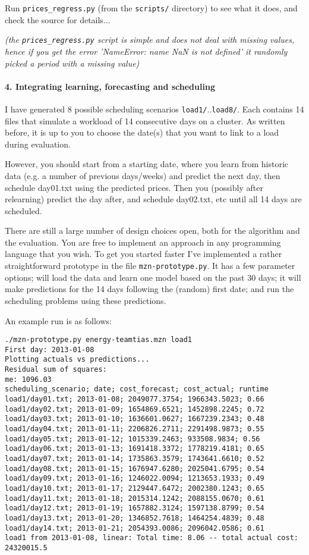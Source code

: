 \documentclass[a4,12pt]{article}
\begin{document}
Run \texttt{prices\_regress.py} (from the \texttt{scripts/} directory) to see what it does, and check the source for details...

\textit{(the \texttt{prices\_regress.py} script is simple and does not deal with missing values, hence if you get the error 'NameError: name NaN is not defined' it randomly picked a period with a missing value)}

\paragraph{4. Integrating learning, forecasting and scheduling}
I have generated 8 possible scheduling scenarios \texttt{load1/}..\texttt{load8/}. Each contains 14 files that simulate a workload of 14 consecutive days on a cluster. As written before, it is up to you to choose the date(s) that you want to link to a load during evaluation.

However, you should start from a starting date, where you learn from historic data (e.g. a number of previous days/weeks) and predict the next day, then schedule day01.txt using the predicted prices. Then you (possibly after relearning) predict the day after, and schedule day02.txt, etc until all 14 days are scheduled.

There are still a large number of design choices open, both for the algorithm and the evaluation. You are free to implement an approach in any programming language that you wish. To get you started faster I've implemented a rather straightforward prototype in the file \texttt{mzn-prototype.py}. It has a few parameter options; will load the data and learn one model based on the past 30 days; it will make predictions for the 14 days following the (random) first date; and run the scheduling problems using these predictions.

An example run is as follows:
\begin{verbatim}
./mzn-prototype.py energy-teamtias.mzn load1          
First day: 2013-01-08
Plotting actuals vs predictions...
Residual sum of squares:
me: 1096.03
scheduling_scenario; date; cost_forecast; cost_actual; runtime
load1/day01.txt; 2013-01-08; 2049077.3754; 1966343.5023; 0.66
load1/day02.txt; 2013-01-09; 1654869.6521; 1452898.2245; 0.72
load1/day03.txt; 2013-01-10; 1636601.0627; 1667239.2343; 0.48
load1/day04.txt; 2013-01-11; 2206826.2711; 2291498.9873; 0.55
load1/day05.txt; 2013-01-12; 1015339.2463; 933508.9834; 0.56
load1/day06.txt; 2013-01-13; 1691418.3372; 1778219.4181; 0.65
load1/day07.txt; 2013-01-14; 1735863.3579; 1743641.6610; 0.52
load1/day08.txt; 2013-01-15; 1676947.6280; 2025041.6795; 0.54
load1/day09.txt; 2013-01-16; 1246022.0094; 1213653.1933; 0.49
load1/day10.txt; 2013-01-17; 2129447.6472; 2002380.1243; 0.65
load1/day11.txt; 2013-01-18; 2015314.1242; 2088155.0670; 0.61
load1/day12.txt; 2013-01-19; 1657882.3124; 1597138.8799; 0.54
load1/day13.txt; 2013-01-20; 1346852.7618; 1464254.4839; 0.48
load1/day14.txt; 2013-01-21; 2054393.0086; 2096042.0586; 0.61
load1 from 2013-01-08, linear: Total time: 8.06 -- total actual cost: 24320015.5
\end{verbatim}
\end{document}
